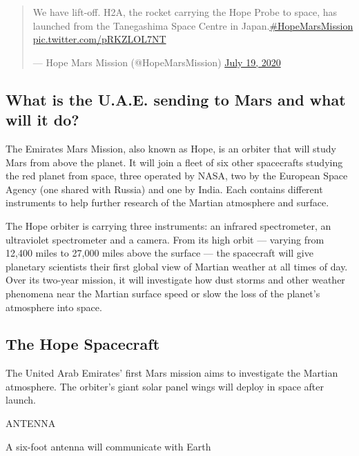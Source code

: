 \begin{quote}
We have lift-off. H2A, the rocket carrying the Hope Probe to space, has
launched from the Tanegashima Space Centre in
Japan.\href{https://twitter.com/hashtag/HopeMarsMission?src=hash\&ref_src=twsrc\%5Etfw}{\#HopeMarsMission}
\href{https://t.co/pRKZLOL7NT}{pic.twitter.com/pRKZLOL7NT}

--- Hope Mars Mission (@HopeMarsMission)
\href{https://twitter.com/HopeMarsMission/status/1284978102058258434?ref_src=twsrc\%5Etfw}{July
19, 2020}
\end{quote}

\hypertarget{what-is-the-uae-sending-to-mars-and-what-will-it-do}{%
\subsection{What is the U.A.E. sending to Mars and what will it
do?}\label{what-is-the-uae-sending-to-mars-and-what-will-it-do}}

The Emirates Mars Mission, also known as Hope, is an orbiter that will
study Mars from above the planet. It will join a fleet of six other
spacecrafts studying the red planet from space, three operated by NASA,
two by the European Space Agency (one shared with Russia) and one by
India. Each contains different instruments to help further research of
the Martian atmosphere and surface.

The Hope orbiter is carrying three instruments: an infrared
spectrometer, an ultraviolet spectrometer and a camera. From its high
orbit --- varying from 12,400 miles to 27,000 miles above the surface
--- the spacecraft will give planetary scientists their first global
view of Martian weather at all times of day. Over its two-year mission,
it will investigate how dust storms and other weather phenomena near the
Martian surface speed or slow the loss of the planet's atmosphere into
space.

\hypertarget{the-hope-spacecraft}{%
\subsection{The Hope Spacecraft}\label{the-hope-spacecraft}}

The United Arab Emirates' first Mars mission aims to investigate the
Martian atmosphere. The orbiter's giant solar panel wings will deploy in
space after launch.

ANTENNA

A six-foot antenna will communicate with Earth

